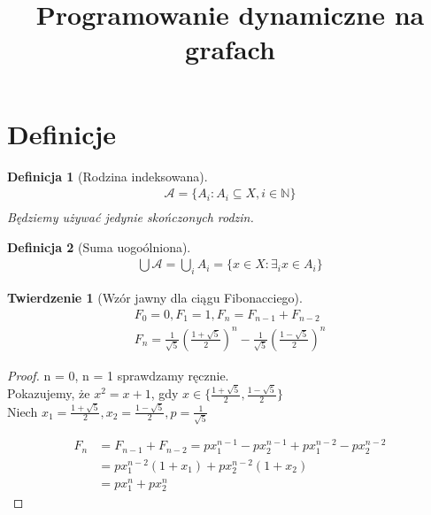 \documentclass[paper=a4, fontsize=11pt]{article}
\title{	
\huge Programowanie dynamiczne na grafach
}
\date{\normalsize}
\begin{document}
\maketitle

\newtheorem{mydef}{Definicja}
\newtheorem{theorem}{Twierdzenie}
\newtheorem{lemma}{Lemat}

\section{Definicje}
\begin{mydef}[Rodzina indeksowana]
\begin{gather*}
\mathcal{A} = \{ A_i : A_i \subseteq X, i \in \mathbb{N} \} \\
\end{gather*}
Będziemy używać jedynie skończonych rodzin.
\end{mydef}
\begin{mydef}[Suma uogoólniona] 
\begin{gather*}
\bigcup \mathcal{A} = \bigcup_i A_i = \{ x \in X : \exists_i x \in A_i \}
\end{gather*}
\end{mydef}

\begin{theorem}[Wzór jawny dla ciągu Fibonacciego]
\begin{gather*}
F_0 = 0, F_1 = 1, F_n = F_{n-1} + F_{n-2} \\
F_n = \frac{1}{\sqrt{5}}(\frac{1 + \sqrt{5}}{2})^n - \frac{1}{\sqrt{5}}(\frac{1 - \sqrt{5}}{2})^n
\end{gather*}
\end{theorem}
\begin{proof}
n = 0, n = 1 sprawdzamy ręcznie. \\
Pokazujemy, że $x^2 = x + 1$, gdy $x \in \{\frac{1 + \sqrt{5}}{2}, \frac{1 - \sqrt{5}}{2}\}$ \\
Niech $x_1 = \frac{1 + \sqrt{5}}{2}, x_2 = \frac{1 - \sqrt{5}}{2}, p = \frac{1}{\sqrt{5}}$

\begin{equation*}
\begin{split}
F_n &= F_{n-1} + F_{n-2} = px_1^{n-1} - px_2^{n-1} + px_1^{n-2} - px_2^{n-2} \\
&= px_1^{n-2}(1 + x_1) + px_2^{n-2}(1 + x_2) \\
&= px_1^n + px_2^n
\end{split}
\end{equation*}
\end{proof}
\end{document}
